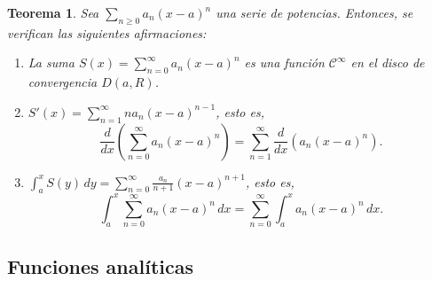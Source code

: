 \documentclass[11pt, a4paper]{article}
\makeatletter
\newif\IfInSansMode
\let\oldsf\sffamily
\renewcommand*{\sffamily}{\oldsf\mathversion{sans}\InSansModetrue}
\let\oldnorm\normalfont
\renewcommand*{\normalfont}{\oldnorm\InSansModefalse\mathversion{normal}}
\renewenvironment{proof}[1][\proofname] {\par\pushQED{\qed}\normalfont\topsep6\p@\@plus6\p@\relax\trivlist\item[\hskip\labelsep\itshape\sffamily#1\@addpunct{.}]\ignorespaces}{\popQED\endtrivlist\@endpefalse}
\theoremstyle{theorem-style}
\newtheorem{nth}{Teorema}[section]
\theoremstyle{definition-style}
\theoremstyle{remark-style}
\theoremstyle{example-style}
\newenvironment{nlist}
{\begin{enumerate}
    \renewcommand\labelenumi{(\emph{\roman{enumi})}}}
  {\end{enumerate}}
\makeatother
\begin{document}
\begin{nth} \label{14}
  Sea $\displaystyle\sum_{n\geq 0} a_n (x-a)^n$ una serie de potencias. Entonces, se verifican las siguientes afirmaciones:	
  \begin{nlist}
  \item La suma $S(x)=\displaystyle\sum_{n= 0}^\infty a_n (x-a)^n$ es una función $\mathcal{C}^\infty$ en el disco de convergencia $D(a,R)$.
  \item $S'(x)= \displaystyle\sum_{n= 1}^\infty n a_n (x-a)^{n-1}$, esto es,
    \[
      \displaystyle\frac{d}{dx} \left( \sum_{n= 0}^\infty a_n (x-a)^n \right) =  \sum_{n= 1}^\infty \frac{d}{dx} \left( a_n (x-a)^n \right) .
    \]
  \item 
    $\displaystyle \int_a^x S(y)\, dy =   \sum_{n= 0}^\infty \frac{a_n}{n+1} (x-a)^{n+1}$, esto es,
    \[
      \int_a^x  \sum_{n= 0}^\infty a_n (x-a)^n \, dx 
      =  \sum_{n= 0}^\infty \int_a^x a_n (x-a)^n \, dx.
    \]
  \end{nlist}
  
  

\end{nth}



\subsection{Funciones analíticas}
\end{document}
